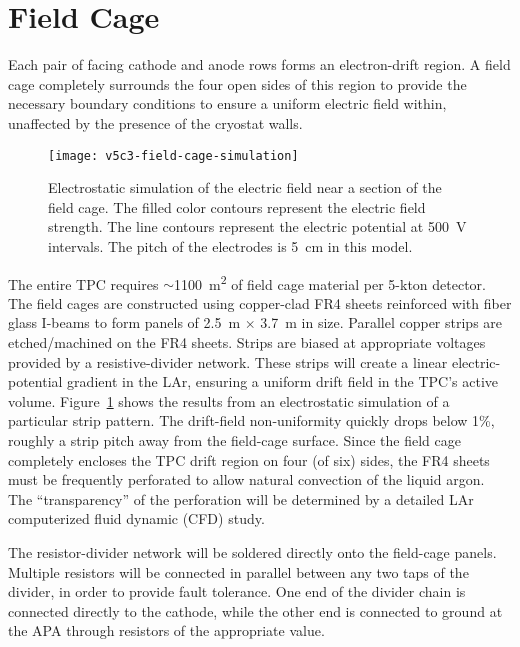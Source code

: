 \section{Field Cage}
\label{subsec:v5-tpc-chamber-fieldcage}

Each pair of facing cathode and anode rows forms an electron-drift region. 
A field cage  completely surrounds the four open sides of this region
to provide the necessary boundary conditions to ensure a uniform electric field within, unaffected by the presence of the cryostat walls.

\begin{figure}[htbp]
\centering
\texttt{[image: v5c3-field-cage-simulation]}
\caption[Electrostatic simulation of electric field near a section 
of field cage]{Electrostatic simulation of the electric field near a section 
of the field cage.  The filled color contours represent the electric 
field strength.  The line contours represent the electric
potential at 500~V intervals.  The pitch of the electrodes is 5~cm in this model. }
\label{fig:tpc-field-cage}
\end{figure}    

The entire TPC requires $\sim$\SI{1100}{\meter\squared} of field 
cage material per 5-kton detector. The field cages are constructed using copper-clad FR4 sheets reinforced with fiber glass I-beams to form panels of 2.5~m $\times$ 3.7~m in size. Parallel copper strips are etched/machined
on the FR4 sheets. Strips are 
biased at appropriate voltages provided by a resistive-divider network. These strips will create
a linear electric-potential gradient in the LAr, ensuring a uniform drift 
field in the TPC's active volume.  Figure~\ref{fig:tpc-field-cage} shows 
the results from an electrostatic simulation of a particular strip pattern. 
The drift-field non-uniformity quickly drops below 1\%, roughly 
a strip pitch away from the field-cage surface. Since the field cage 
completely encloses the TPC drift region on four (of six) sides, the FR4 sheets must 
be frequently perforated to allow natural convection of the liquid argon.  
The ``transparency'' of the perforation will be determined by a 
detailed LAr computerized fluid dynamic (CFD) study.

The resistor-divider network will be soldered directly onto the field-cage panels. 
Multiple resistors will be connected in parallel between any two taps of the divider,
in order to provide fault tolerance. 
One end of the divider chain is connected directly to the cathode, while the other end is connected to ground at the APA through resistors of the appropriate value. 


